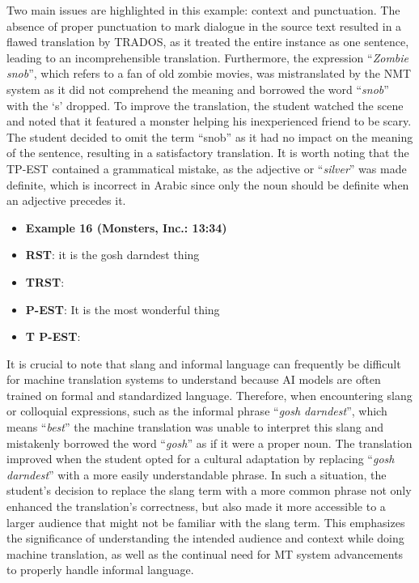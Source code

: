 \documentclass[english]{textolivre}
\begin{document}
Two main issues are highlighted in this example: context and punctuation. The absence of proper punctuation to mark dialogue in the source text resulted in a flawed translation by TRADOS, as it treated the entire instance as one sentence, leading to an incomprehensible translation. Furthermore, the expression “\emph{Zombie snob}”, which refers to a fan of old zombie movies, was mistranslated by the NMT system as it did not comprehend the meaning and borrowed the word “\emph{snob}” with the ‘s’ dropped. To improve the translation, the student watched the scene and noted that it featured a monster helping his inexperienced friend to be scary. The student decided to omit the term “snob” as it had no impact on the meaning of the sentence, resulting in a satisfactory translation. It is worth noting that the TP-EST contained a grammatical mistake, as the adjective  or “\emph{silver}” was made definite, which is incorrect in Arabic since only the noun should be definite when an adjective precedes it.

\begin{itemize}
 \item \textbf{Example 16 (Monsters, Inc.: 13:34)} 
\item \textbf{RST}: it is the gosh darndest thing
\item \textbf{TRST}: 
\item \textbf{P-EST}: It is the most wonderful thing
\item \textbf{T P-EST}: 
\end{itemize}

It is crucial to note that slang and informal language can frequently be difficult for machine translation systems to understand because AI models are often trained on formal and standardized language. Therefore, when encountering slang or colloquial expressions, such as the informal phrase “\emph{gosh darndest}”, which means “\emph{best}” the machine translation was unable to interpret this slang and mistakenly borrowed the word “\emph{gosh}” as if it were a proper noun. The translation improved when the student opted for a cultural adaptation by replacing “\emph{gosh darndest}” with a more easily understandable phrase. In such a situation, the student's decision to replace the slang term with a more common phrase not only enhanced the translation's correctness, but also made it more accessible to a larger audience that might not be familiar with the slang term. This emphasizes the significance of understanding the intended audience and context while doing machine translation, as well as the continual need for MT system advancements to properly handle informal language.
\end{document}
